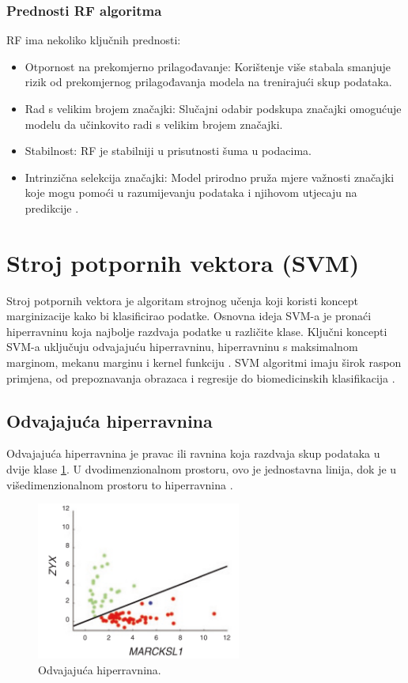 \documentclass[zavrsnirad,upload]{fer}
\begin{document}
\subsubsection{Prednosti RF algoritma}
RF ima nekoliko ključnih prednosti:
\begin{itemize}
	\item Otpornost na prekomjerno prilagođavanje: Korištenje više stabala smanjuje rizik od prekomjernog prilagođavanja modela na trenirajući skup podataka.
	\item Rad s velikim brojem značajki: Slučajni odabir podskupa značajki omogućuje modelu da učinkovito radi s velikim brojem značajki.
	\item Stabilnost: RF je stabilniji u prisutnosti šuma u podacima.
	\item Intrinzična selekcija značajki: Model prirodno pruža mjere važnosti značajki koje mogu pomoći u razumijevanju podataka i njihovom utjecaju na predikcije \cite{sarica2017}.
\end{itemize}


\section{Stroj potpornih vektora (SVM)}
Stroj potpornih vektora je algoritam strojnog učenja koji koristi koncept marginizacije kako bi klasificirao podatke. Osnovna ideja SVM-a je pronaći hiperravninu koja najbolje razdvaja podatke u različite klase. Ključni koncepti SVM-a uključuju odvajajuću hiperravninu, hiperravninu s maksimalnom marginom, mekanu marginu i kernel funkciju \cite{fletcher2009}.
SVM algoritmi imaju širok raspon primjena, od prepoznavanja obrazaca i regresije do biomedicinskih klasifikacija \cite{Noble2006}.

\subsection{Odvajajuća hiperravnina}
Odvajajuća hiperravnina je pravac ili ravnina koja razdvaja skup podataka u dvije klase \ref{fig:odv_hiper}. U dvodimenzionalnom prostoru, ovo je jednostavna linija, dok je u višedimenzionalnom prostoru to hiperravnina \cite{Noble2006}.
\begin{figure}[h]
	\centering
	\includegraphics[width=0.6\textwidth]{Figures/odv_hiperravnina.png}
	\caption{Odvajajuća hiperravnina. \cite{Noble2006}}
	\label{fig:odv_hiper}
\end{figure}
\end{document}
